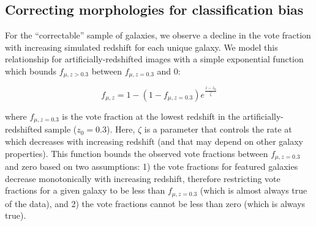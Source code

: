 \documentclass[a4paper,fleqn,usenatbib]{mnras}
\begin{document}
\subsection{Correcting morphologies for classification bias}\label{ssec:zeta}

For the ``correctable'' sample of galaxies, we observe a decline in the vote fraction
\ffeatures{} with increasing simulated redshift for each unique galaxy. 
We model this relationship for artificially-redshifted images with a simple exponential
function which bounds $f_{\mu, z>0.3}$  between $f_{\mu, z=0.3}$ and 0:

\begin{equation}
f_{\mu,z} = 1 - (1 - f_{\mu,z=0.3})e^{\frac{z-z_0}{\hat\zeta}}
\label{eqn:fzeta}
\end{equation}


\noindent where $f_{\mu,z=0.3}$ is the vote fraction at the lowest redshift in
the artificially-redshifted sample ($z_0=0.3$). Here, $\zeta$ is a parameter that
controls the rate at which \ffeatures{} decreases with increasing redshift (and
that may depend on other galaxy properties). This function bounds the observed
vote fractions between $f_{\mu,z=0.3}$ and zero based on two assumptions: 1)
the vote fractions for featured galaxies decrease monotonically with increasing
redshift, therefore restricting vote fractions for a given galaxy to be less
than $f_{\mu,z=0.3}$ (which is almost always true of the data), and 2) the
vote fractions cannot be less than zero (which is always true).
\end{document}
